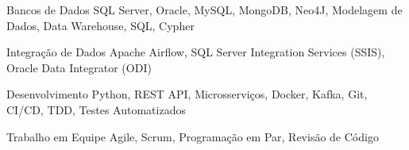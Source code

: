 


\begin{cvskills}


\cvskill
{Bancos de Dados} %
{SQL Server, Oracle, MySQL, MongoDB, Neo4J, Modelagem de Dados, Data Warehouse, SQL, Cypher} %

\cvskill
{Integração de Dados} %
{Apache Airflow, SQL Server Integration Services (SSIS), Oracle Data Integrator (ODI)} %

\cvskill
{Desenvolvimento} %
{Python, REST API, Microsserviços, Docker, Kafka, Git, CI/CD, TDD, Testes Automatizados} %


\cvskill
{Trabalho em Equipe} %
{Agile, Scrum, Programação em Par, Revisão de Código} %


\end{cvskills}